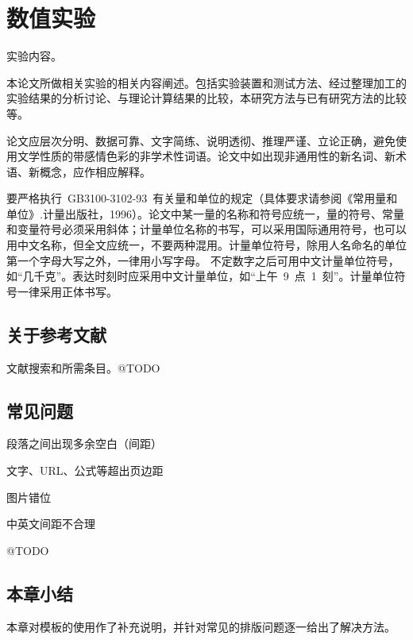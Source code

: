 
\chapter{数值实验}
	实验内容。
	
	本论文所做相关实验的相关内容阐述。包括实验装置和测试方法、经过整理加工的实验结果的分析讨论、与理论计算结果的比较，本研究方法与已有研究方法的比较等。
	
	论文应层次分明、数据可靠、文字简练、说明透彻、推理严谨、立论正确，避免使用文学性质的带感情色彩的非学术性词语。论文中如出现非通用性的新名词、新术语、新概念，应作相应解释。
	
	要严格执行~GB3100-3102-93~有关量和单位的规定（具体要求请参阅《常用量和单位》.计量出版社，1996）。论文中某一量的名称和符号应统一，量的符号、常量和变量符号必须采用斜体；计量单位名称的书写，可以采用国际通用符号，也可以用中文名称，但全文应统一，不要两种混用。计量单位符号，除用人名命名的单位第一个字母大写之外，一律用小写字母。
不定数字之后可用中文计量单位符号，如“几千克”。表达时刻时应采用中文计量单位，如“上午~9~点~1~刻”。计量单位符号一律采用正体书写。

\section{关于参考文献}
	文献搜索和所需条目。@TODO

\section{常见问题}
	\begin{enum}
		\item 段落之间出现多余空白（间距）
		\item 文字、URL、公式等超出页边距
		\item 图片错位
		\item 中英文间距不合理
	\end{enum}
	
	@TODO
	
\section{本章小结}
	本章对模板的使用作了补充说明，并针对常见的排版问题逐一给出了解决方法。